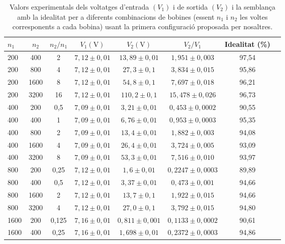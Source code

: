 \documentclass[a4paper,10.5pt]{report}
\begin{document}
\begin{table}[h]
	\centering
	\renewcommand{\arraystretch}{1.2}
	\caption{Valors experimentals dels voltatges d'entrada $(V_1)$ i de sortida $(V_2)$ i la semblança amb la idealitat per a diferents combinacions de bobines (essent $n_1$ i $n_2$ les voltes corresponents a cada bobina) usant la primera configuració proposada per nosaltres.}
	\begin{tabular}{lccccccc}
		\toprule
		$n_1$ & $n_2$ & $n_2/n_1$ & $V_1 (\text{V})$ & $V_2 (\text{V})$ & $V_2/V_1$ & Idealitat (\%) \\
		\midrule
		200 & 400 & 2 & $7{,}12 \pm 0{,}01$ & $13{,}89 \pm 0{,}01$ & $1{,}951 \pm 0{,}003$ & 97,54  \\
		200 & 800 & 4 & $7{,}12 \pm 0{,}01$ & $27{,}3 \pm 0{,}1$ & $3{,}834 \pm 0{,}015$ & 95,86 \\
		200 & 1600 & 8 & $7{,}12 \pm 0{,}01$ & $54{,}8 \pm 0{,}1$ & $7{,}697 \pm 0{,}018$ & 96,21 \\
		200 & 3200 & 16 & $7{,}12 \pm 0{,}01$ & $110{,}2 \pm 0{,}1$ & $15{,}478 \pm 0{,}026$ & 96,73  \\
		\midrule
		400 & 200 & 0{,}5 & $7{,}09 \pm 0{,}01$ & $3{,}21 \pm 0{,}01$ & $0{,}453 \pm 0{,}0002$ & 90,55  \\
		400 & 400 & 1 & $7{,}09 \pm 0{,}01$ & $6{,}76 \pm 0{,}01$ & $0{,}953 \pm 0{,}0003$ & 95,35 \\
		400 & 800 & 2 & $7{,}09 \pm 0{,}01$ & $13{,}4 \pm 0{,}01$ & $1{,}882 \pm 0{,}003$ & 94,08 \\
		400 & 1600 & 4 & $7{,}09 \pm 0{,}01$ & $26{,}4 \pm 0{,}01$ & $3{,}724 \pm 0{,}005$ & 93,09 \\
		400 & 3200 & 8 & $7{,}09 \pm 0{,}01$ & $53{,}3 \pm 0{,}01$ & $7{,}516 \pm 0{,}010$ & 93,97  \\
		\midrule
		800 & 200 & 0{,}25 & $7{,}12 \pm 0{,}01$ & $1{,}6 \pm 0{,}01$ & $0{,}2247 \pm 0{,}0003$ & 89,89  \\
		800 & 400 & 0{,}5 & $7{,}12 \pm 0{,}01$ & $3{,}37 \pm 0{,}01$ & $0{,}473 \pm 0{,}001$ & 94,66 \\
		800 & 1600 & 2 & $7{,}12 \pm 0{,}01$ & $13{,}7 \pm 0{,}1$ & $1{,}922 \pm 0{,}015$ & 94,66 \\
		800 & 3200 & 4 & $7{,}12 \pm 0{,}01$ & $27{,}0 \pm 0{,}1$ & $3{,}792 \pm 0{,}015$ & 94,80  \\
		\midrule
		1600 & 200 & 0{,}125 & $7{,}16 \pm 0{,}01$ & $0{,}811 \pm 0{,}001$ & $0{,}1133 \pm 0{,}0002$ & 90,61  \\
		1600 & 400 & 0{,}25 & $7{,}16 \pm 0{,}01$ & $1{,}698 \pm 0{,}01$ & $0{,}2372 \pm 0{,}0003$ & 94,86 \\

\end{tabular}
\end{table}
\end{document}
